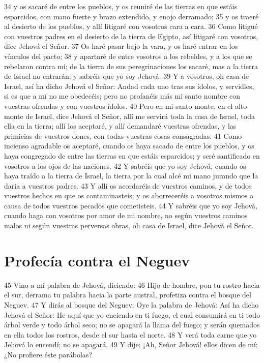 34 y os sacaré de entre los pueblos, y os reuniré de las tierras en que estáis esparcidos, con mano fuerte y brazo extendido, y enojo derramado;
35 y os traeré al desierto de los pueblos, y allí litigaré con vosotros cara a cara.
36 Como litigué con vuestros padres en el desierto de la tierra de Egipto, así litigaré con vosotros, dice Jehová el Señor.
37 Os haré pasar bajo la vara, y os haré entrar en los vínculos del pacto;
38 y apartaré de entre vosotros a los rebeldes, y a los que se rebelaron contra mí; de la tierra de sus peregrinaciones los sacaré, mas a la tierra de Israel no entrarán; y sabréis que yo soy Jehová.
39 Y a vosotros, oh casa de Israel, así ha dicho Jehová el Señor: Andad cada uno tras sus ídolos, y servidles, si es que a mí no me obedecéis; pero no profanéis más mi santo nombre con vuestras ofrendas y con vuestros ídolos.
40 Pero en mi santo monte, en el alto monte de Israel, dice Jehová el Señor, allí me servirá toda la casa de Israel, toda ella en la tierra; allí los aceptaré, y allí demandaré vuestras ofrendas, y las primicias de vuestros dones, con todas vuestras cosas consagradas.
41 Como incienso agradable os aceptaré, cuando os haya sacado de entre los pueblos, y os haya congregado de entre las tierras en que estáis esparcidos; y seré santificado en vosotros a los ojos de las naciones.
42 Y sabréis que yo soy Jehová, cuando os haya traído a la tierra de Israel, la tierra por la cual alcé mi mano jurando que la daría a vuestros padres.
43 Y allí os acordaréis de vuestros caminos, y de todos vuestros hechos en que os contaminasteis; y os aborreceréis a vosotros mismos a causa de todos vuestros pecados que cometisteis.
44 Y sabréis que yo soy Jehová, cuando haga con vosotros por amor de mi nombre, no según vuestros caminos malos ni según vuestras perversas obras, oh casa de Israel, dice Jehová el Señor.

\section*{Profecía contra el Neguev}

45 Vino a mí palabra de Jehová, diciendo:
46 Hijo de hombre, pon tu rostro hacia el sur, derrama tu palabra hacia la parte austral, profetiza contra el bosque del Neguev.
47 Y dirás al bosque del Neguev: Oye la palabra de Jehová: Así ha dicho Jehová el Señor: He aquí que yo enciendo en ti fuego, el cual consumirá en ti todo árbol verde y todo árbol seco; no se apagará la llama del fuego; y serán quemados en ella todos los rostros, desde el sur hasta el norte.
48 Y verá toda carne que yo Jehová lo encendí; no se apagará.
49 Y dije: ¡Ah, Señor Jehová! ellos dicen de mí: ¿No profiere éste parábolas?

